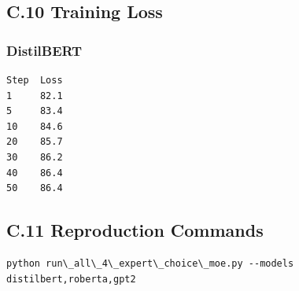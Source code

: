 \subsection{C.10 Training Loss}

\subsubsection{DistilBERT}
\begin{lstlisting}
Step  Loss
1     82.1
5     83.4
10    84.6
20    85.7
30    86.2
40    86.4
50    86.4
\end{lstlisting}

\subsection{C.11 Reproduction Commands}

\begin{lstlisting}
python run\_all\_4\_expert\_choice\_moe.py --models distilbert,roberta,gpt2
\end{lstlisting}

